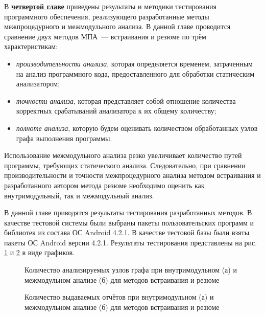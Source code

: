 В \underline{\textbf{четвертой главе}} приведены результаты и методики тестирования программного обеспечения, реализующего разработанные методы межпроцедурного и межмодульного анализа. В данной главе проводится сравнение двух методов МПА~--- встраивания и резюме по трём характеристикам:
\begin{itemize}[leftmargin=1em]
 \item \textit{производительности анализа}, которая определяется временем, затраченным на анализ программного кода, предоставленного для обработки статическим анализатором;
 \item \textit{точности анализа}, которая представляет собой отношение количества корректных срабатываний анализатора к их общему количеству;
 \item \textit{полноте анализа}, которую будем оценивать количеством обработанных узлов графа выполнения программы.
\end{itemize}

Использование межмодульного анализа резко увеличивает количество  путей программы, требующих статического анализа. Следовательно, при сравнении производительности и точности межпроцедурного анализа методом встраивания и разработанного автором метода резюме необходимо оценить как внутримодульный, так и межмодульный анализ.

В данной главе приводятся результаты тестирования разработанных методов. В качестве тестовой системы были выбраны пакеты пользовательских программ и библиотек из состава ОС Android 4.2.1. В качестве тестовой базы были взяты пакеты ОС Android версии 4.2.1. Результаты тестирования представлены на рис. \ref{img:nodes} и \ref{img:defects} в виде графиков.


\begin{figure}[ht]
  \begin{minipage}[ht]{0.49\linewidth}
  \end{minipage}
  \hfill
  \begin{minipage}[ht]{0.49\linewidth}
  \end{minipage}
  \caption{Количество анализируемых узлов графа при внутримодульном (а) и межмодульном анализе (б) для методов встраивания и резюме}
  \label{img:nodes}  
\end{figure}

\begin{figure}[ht]
  \begin{minipage}[ht]{0.49\linewidth}
  \end{minipage}
  \hfill
  \begin{minipage}[ht]{0.49\linewidth}
  \end{minipage}
  \caption{Количество выдаваемых отчётов при внутримодульном (а) и межмодульном анализе (б) для методов встраивания и резюме}
  \label{img:defects}  
\end{figure}


